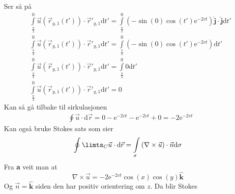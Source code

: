 \documentclass[a4paper,10pt,norsk]{article}
\newcommand{\dd}[1]{\mathrm{d}#1}
\newcommand{\uvec}[1]{\boldsymbol{\hat{\textbf{#1}}}}
\begin{document}
		Ser så på
		\begin{align*}
			&\int\limits_{\frac{\pi}{2}}^0 \vec{u} \left( \vec{r}_{y,1}(t') \right) \cdot \overrightarrow{r}'_{y,1} \dd{t'} = 
			\int\limits_{\frac{\pi}{2}}^0 \left( -\sin(0) \cos(t') \mathrm{e}^{-2vt}  \right) \uvec{j} \cdot \uvec{j} \dd{t'}\\
			&\int\limits_{\frac{\pi}{2}}^0 \vec{u} \left( \vec{r}_{y,1}(t') \right) \cdot \overrightarrow{r}'_{y,1} \dd{t'} =
			\int\limits_{\frac{\pi}{2}}^0 \left( -\sin(0) \cos(t') \mathrm{e}^{-2vt}  \right) \dd{t'}\\
			&\int\limits_{\frac{\pi}{2}}^0 \vec{u} \left( \vec{r}_{y,1}(t') \right) \cdot \overrightarrow{r}'_{y,1} \dd{t'} =
			\int\limits_{\frac{\pi}{2}}^0 0 \dd{t'}\\
			&\int\limits_{\frac{\pi}{2}}^0 \vec{u} \left( \vec{r}_{y,1}(t') \right) \cdot \overrightarrow{r}'_{y,1} \dd{t'} = 0
		\end{align*}
		Kan så gå tilbake til sirkulasjonen
		\begin{align*}
			&\oint \vec{u}  \cdot \dd{\vec{r} } = 0  - \mathrm{e}^{-2vt} - \mathrm{e}^{-2vt} + 0 = -2 \mathrm{e}^{-2vt}
		\end{align*}
		Kan også bruke Stokes sats som sier \[
			\oint\limts_C \vec{u} \cdot \dd{\vec{r}} = \int\limits_\sigma \left( \nabla \times \vec{u}  \right) \cdot \vec{n} \dd{\sigma}
		\] 
		Fra \textbf{a} veit man at\[
			 \nabla \times \vec{u} = -2\mathrm{e}^{-2vt} \cos(x) \cos(y) \uvec{k}
		\]  
		Og $\vec{n} = \uvec{k}$ siden den har positiv orientering om $z$. Da blir Stokes
\end{document}
